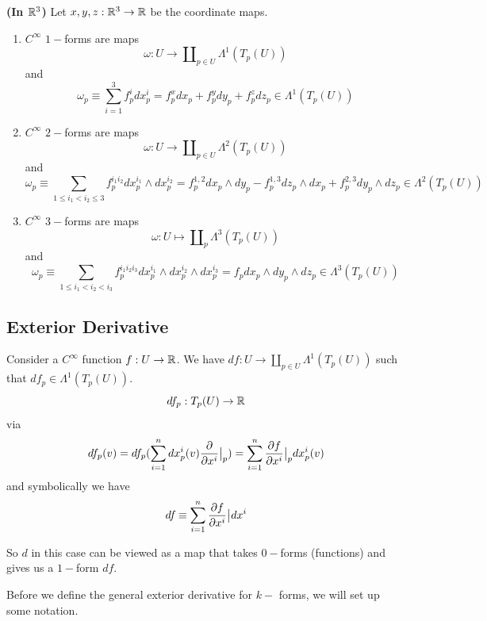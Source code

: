 \begin{example} \textbf{(In $\mathbb{R}^3$)} Let $x,y,z:\mathbb{R}^3\to \mathbb{R}$ be the coordinate maps. 
\begin{enumerate}
    \item $C^{\infty}$ $1-$forms are maps $$\omega:U\to \amalg_{p\in U} \Lambda^1(T_p(U))$$ and $$\omega_p\equiv \sum_{i=1}^3 f^i_p dx^i_p =f^x_p dx_p +f^y_p dy_p +f^z_p dz_p \in \Lambda^1(T_p(U)) $$
    \item $C^{\infty}$ $2-$forms are maps $$\omega: U\to \amalg_{p\in U} \Lambda^2(T_p(U)) $$ and $$\omega_p\equiv \sum_{1\leq i_1< i_2\leq 3} f^{i_1 i_2}_p dx^{i_1}_p\wedge dx^{i_2}_p = f_p^{1,2} dx_p \wedge dy_p - f_p^{1,3} dz_p \wedge dx_p + f^{2,3}_p dy_p\wedge dz_p  \in \Lambda^2(T_p(U))$$
    \item $C^{\infty}$ $3-$forms are maps $$\omega:U\mapsto \amalg_p \Lambda^3(T_p(U)) $$ and $$\omega_p \equiv \sum_{1\leq i_1<i_2<i_3} f^{i_1 i_2 i_3}_p dx^{i_1}_p\wedge dx^{i_2}_p\wedge dx^{i_3}_p= f_p dx_p \wedge dy_p \wedge dz_p \in \Lambda^3(T_p(U)) $$
\end{enumerate}
    
\end{example}


\subsection{Exterior Derivative}

Consider a $C^{\infty}$ function $f: U\to \mathbb{R}$. We have $df:U\to \amalg_{p\in U} \Lambda^1(T_p(U))$ such that $df_p \in \Lambda^1(T_p(U))$. $$df_p:T_p(U)\to \mathbb{R}$$ via $$df_p(v)=df_p(\sum_{i=1}^n dx^i_p(v)\frac{\partial}{\partial x^i}\big{|}_p )=\sum_{i=1}^n \frac{\partial f}{\partial x^i}\big{|}_p dx^i_p(v)$$ and symbolically we have $$df_{} \equiv \sum_{i=1}^n \frac{\partial f}{\partial x^i}\big{|}_{} dx^i_{}$$

So $d$ in this case can be viewed as a map that takes $0-$forms (functions) and gives us a $1-$form $df$.

Before we define the general exterior derivative for $k-$ forms, we will set up some notation.


